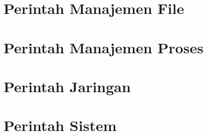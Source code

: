 \section{Perintah Manajemen File}


\section{Perintah Manajemen Proses}


\section{Perintah Jaringan}


\section{Perintah Sistem}

